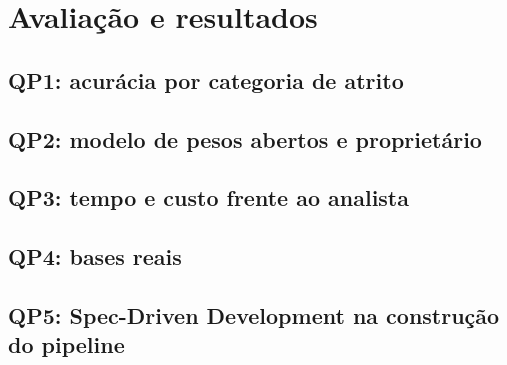 \chapter{Avaliação e resultados}
\label{chap:resultados}


\section{QP1: acurácia por categoria de atrito}
\label{sec:resultados-qp1-acuracia-por-categoria-de-atrito}

\section{QP2: modelo de pesos abertos e proprietário}
\label{sec:resultados-qp2-modelo-de-pesos-abertos-e-proprietario}

\section{QP3: tempo e custo frente ao analista}
\label{sec:resultados-qp3-tempo-e-custo-frente-ao-analista}

\section{QP4: bases reais}
\label{sec:resultados-qp4-bases-reais}

\section{QP5: Spec-Driven Development na construção do pipeline}
\label{sec:resultados-qp5-spec-driven-development-na-construcao-do-pipeline}
